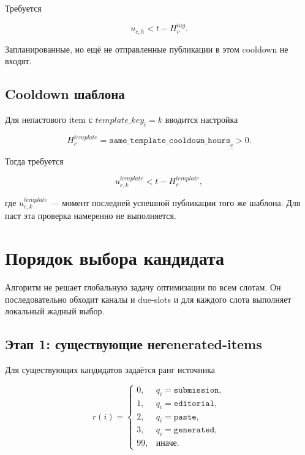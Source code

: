\documentclass[12pt,a4paper]{article}
\newcommand{\Field}[1]{\texttt{#1}}
\newcommand{\Source}[1]{\texttt{#1}}
\begin{document}
Требуется

\begin{equation}
  u_{c,h}<t-H_c^{tag}.
  \label{eq:tag-cooldown}
\end{equation}

Запланированные, но ещё не отправленные публикации в этом cooldown не входят.

\subsection{Cooldown шаблона}

Для непастового item с $template\_key_i=k$ вводится настройка

\begin{equation}
  H_c^{template}=\Field{same\_template\_cooldown\_hours}_c>0.
\end{equation}

Тогда требуется

\begin{equation}
  u_{c,k}^{template}<t-H_c^{template},
  \label{eq:template-cooldown}
\end{equation}

где $u_{c,k}^{template}$ --- момент последней успешной публикации того же
шаблона. Для паст эта проверка намеренно не выполняется.

\section{Порядок выбора кандидата}

Алгоритм не решает глобальную задачу оптимизации по всем слотам. Он последовательно
обходит каналы и due-slots и для каждого слота выполняет локальный жадный выбор.

\subsection{Этап 1: существующие негenerated-items}

Для существующих кандидатов задаётся ранг источника

\begin{equation}
  r(i)=
  \begin{cases}
    0,&q_i=\Source{submission},\\
    1,&q_i=\Source{editorial},\\
    2,&q_i=\Source{paste},\\
    3,&q_i=\Source{generated},\\
    99,&\text{иначе}.
  \end{cases}
  \label{eq:source-rank}
\end{equation}
\end{document}
